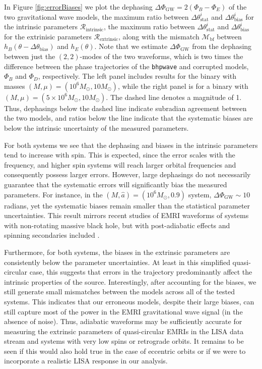 \documentclass[%
 reprint,
 nofootinbib,
 amsmath,amssymb,
 aps,
 prd,
]{revtex4-2}
\begin{document}
In Figure \ref{fig:errorBiases} we plot the dephasing $\Delta \Phi_\mathrm{GW} = 2(\Phi_B - \Phi_E)$ of the two gravitational wave models, the maximum ratio between $\Delta \theta^i_\mathrm{stat}$ and $\Delta \theta^i_\mathrm{bias}$ for the intrinsic parameters $\mathcal{R}_\mathrm{intrinsic}$, the maximum ratio between $\Delta \theta^i_\mathrm{stat}$ and $\Delta \theta^i_\mathrm{bias}$ for the extrinisic parameters $\mathcal{R}_\mathrm{extrinsic}$, along with the mismatch $\mathcal{M}_\mathrm{bf}$ between $h_B(\theta-\Delta \theta_\mathrm{bias})$ and $h_E(\theta)$. Note that we estimate $\Delta \Phi_\mathrm{GW}$ from the dephasing between just the $(2,2)$-modes of the two waveforms, which is two times the difference between the phase trajectories of the \texttt{bhpwave} and corrupted models, $\Phi_B$ and $ \Phi_D$, respectively. The left panel includes results for the binary with masses $(M, \mu) = (10^6 M_\odot, 10 M_\odot)$, while the right panel is for a binary with $(M, \mu) = (5\times 10^6 M_\odot, 10 M_\odot)$. The dashed line denotes a magnitude of 1. Thus, dephasings below the dashed line indicate subradian agreement between the two models, and ratios below the line indicate that the systematic biases are below the intrinsic uncertainty of the measured parameters.

For both systems we see that the dephasing and biases in the intrinsic parameters tend to increase with spin. This is expected, since the error scales with the frequency, and higher spin systems will reach larger orbital frequencies and consequently possess larger errors. However, large dephasings do not necessarily guarantee that the systematic errors will significantly bias the measured parameters. For instance, in the $(M, \hat{a})=(10^6 M_\odot, 0.9)$ system, $\Delta \Phi_\mathrm{GW} \sim 10$ radians, yet the systematic biases remain smaller than the statistical parameter uncertainties. This result mirrors recent studies of EMRI waveforms of systems with non-rotating massive black hole, but with post-adiabatic effects and spinning secondaries included \cite{BurkETC23}. 

Furthermore, for both systems, the biases in the extrinsic parameters are consistently below the parameter uncertainties. At least in this simplified quasi-circular case, this suggests that errors in the trajectory predominantly affect the intrinsic properties of the source. Interestingly, after accounting for the biases, we still generate small mismatches between the models across all of the tested systems. This indicates that our erroneous models, despite their large biases, can still capture most of the power in the EMRI gravitational wave signal (in the absence of noise). Thus, adiabatic waveforms may be sufficiently accurate for measuring the extrinsic parameters of quasi-circular EMRIs in the LISA data stream and systems with very low spins or retrograde orbits. It remains to be seen if this would also hold true in the case of eccentric orbits or if we were to incorporate a realistic LISA response in our analysis.
\end{document}
